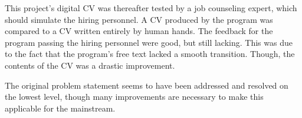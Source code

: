 This project’s digital CV was thereafter tested by a job counseling expert, which should simulate the hiring personnel. 
A CV produced by the program was compared to a CV written entirely by human hands.
The feedback for the program passing the hiring personnel were good, but still lacking. 
This was due to the fact that the program’s free text lacked a smooth transition. Though, the contents of the CV was a drastic improvement.

The original problem statement seems to have been addressed and resolved on the lowest level, though many improvements are necessary to make this applicable for the mainstream.
\clearpage